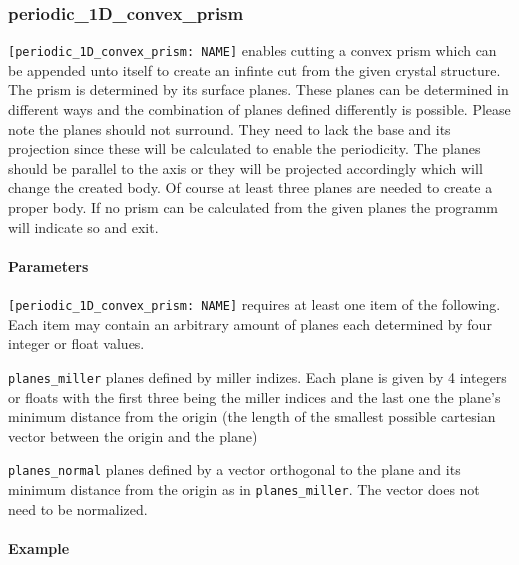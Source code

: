 \subsubsection{periodic\_1D\_convex\_prism}
\lstinline{[periodic_1D_convex_prism: NAME]} enables cutting a convex prism which can be appended unto itself to create an infinte cut from the given crystal structure. The prism is determined by its surface planes. These planes can be determined in different ways and the combination of planes defined differently is possible. Please note the planes should not surround. They need to lack the base and its projection since these will be calculated to enable the periodicity. The planes should be parallel to the axis or they will be projected accordingly which will change the created body. Of course at least three planes are needed to create a proper body. If no prism can be calculated from the given planes the programm will indicate so and exit.

\paragraph{Parameters}
\lstinline{[periodic_1D_convex_prism: NAME]} requires at least one item of the following. Each item may contain an arbitrary amount of planes each determined by four integer or float values.

\begin{description}
 \item{\lstinline{planes_miller}} planes defined by miller indizes. Each plane is given by 4 integers or floats with the first three being the miller indices and the last one the plane's minimum distance from the origin (the length of the smallest possible cartesian vector between the origin and the plane)
 \item{\lstinline{planes_normal}} planes defined by a vector orthogonal to the plane and its minimum distance from the origin as in \lstinline{planes_miller}. The vector does not need to be normalized.
\end{description} 


\paragraph{Example}

